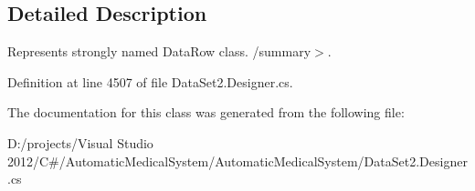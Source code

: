 \subsection{Detailed Description}
Represents strongly named DataRow class. /summary$>$. 

Definition at line 4507 of file DataSet2.Designer.cs.

The documentation for this class was generated from the following file:\begin{CompactItemize}
\item 
D:/projects/Visual Studio 2012/C\#/AutomaticMedicalSystem/AutomaticMedicalSystem/DataSet2.Designer.cs\end{CompactItemize}
